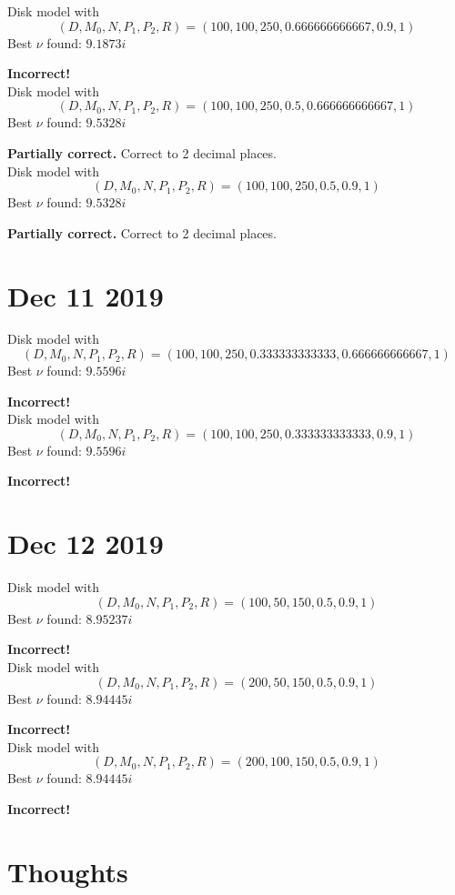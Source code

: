 \documentclass[]{article}
\begin{document}
Disk model with
$$
(D, M_0, N, P_1, P_2, R) =
( 100,100,250,0.666666666667,0.9,1 )
$$
Best $\nu$ found: $9.1873i$

\textbf{Incorrect!}
\\

Disk model with
$$
(D, M_0, N, P_1, P_2, R) =
( 100,100,250,0.5,0.666666666667,1 )
$$
Best $\nu$ found: $9.5328i$

\textbf{Partially correct.}
Correct to 2 decimal places.
\\

Disk model with
$$
(D, M_0, N, P_1, P_2, R) =
( 100,100,250,0.5,0.9,1 )
$$
Best $\nu$ found: $9.5328i$

\textbf{Partially correct.}
Correct to 2 decimal places.

\section*{Dec 11 2019}

Disk model with
$$
(D, M_0, N, P_1, P_2, R) =
( 100,100,250,0.333333333333,0.666666666667,1 )
$$
Best $\nu$ found: $9.5596i$

\textbf{Incorrect!}
\\

Disk model with
$$
(D, M_0, N, P_1, P_2, R) =
( 100,100,250,0.333333333333,0.9,1 )
$$
Best $\nu$ found: $9.5596i$

\textbf{Incorrect!}

\section*{Dec 12 2019}

Disk model with
$$
(D, M_0, N, P_1, P_2, R) =
( 100,50,150,0.5,0.9,1 )
$$
Best $\nu$ found: $8.95237i$

\textbf{Incorrect!}
\\

Disk model with
$$
(D, M_0, N, P_1, P_2, R) =
( 200,50,150,0.5,0.9,1 )
$$
Best $\nu$ found: $8.94445i$

\textbf{Incorrect!}
\\

Disk model with
$$
(D, M_0, N, P_1, P_2, R) =
( 200,100,150,0.5,0.9,1 )
$$
Best $\nu$ found: $8.94445i$

\textbf{Incorrect!}

\section*{Thoughts}
\end{document}
